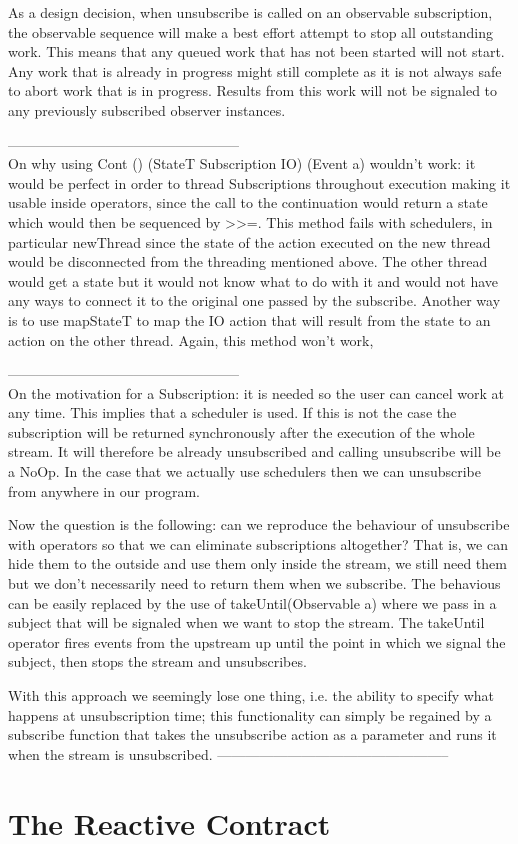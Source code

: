 As a design decision, when unsubscribe is called on an observable subscription, the observable sequence will make a best effort attempt to stop all outstanding work. This means that any queued work that has not been started will not start. Any work that is already in progress might still complete as it is not always safe to abort work that is in progress. Results from this work will not be signaled to any previously subscribed observer instances.



--------------------------------------------------\\
On why using Cont () (StateT Subscription IO) (Event a) wouldn't work: it would be perfect in order to thread Subscriptions throughout execution making it usable inside operators, since the call to the continuation would return a state which would then be sequenced by >>=. This method fails with schedulers, in particular newThread since the state of the action executed on the new thread would be disconnected from the threading mentioned above. The other thread would get a state but it would not know what to do with it and would not have any ways to connect it to the original one passed by the subscribe. Another way is to use mapStateT to map the IO action that will result from the state to an action on the other thread. Again, this method won't work, 

--------------------------------------------------\\
On the motivation for a Subscription: it is needed so the user can cancel work at any time. This implies that a scheduler is used. If this is not the case the subscription will be returned synchronously after the execution of the whole stream. It will therefore be already unsubscribed and calling unsubscribe will be a NoOp. In the case that we actually use schedulers then we can unsubscribe from anywhere in our program. 

Now the question is the following: can we reproduce the behaviour of unsubscribe with operators so that we can eliminate subscriptions altogether? That is, we can hide them to the outside and use them only inside the stream, we still need them but we don't necessarily need to return them when we subscribe. The behavious can be easily replaced by the use of takeUntil(Observable a) where we pass in a subject that will be signaled when we want to stop the stream. The takeUntil operator fires events from the upstream up until the point in which we signal the subject, then stops the stream and unsubscribes. 

With this approach we seemingly lose one thing, i.e. the ability to specify what happens at unsubscription time; this functionality can simply be regained by a subscribe function that takes the unsubscribe action as a parameter and runs it when the stream is unsubscribed.
--------------------------------------------------

\section{The Reactive Contract}